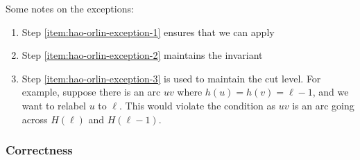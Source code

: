 Some notes on the exceptions:
\begin{enumerate}
    \item Step \ref{item:hao-orlin-exception-1} ensures that we can apply 
    \item Step \ref{item:hao-orlin-exception-2} maintains the invariant
    \item Step \ref{item:hao-orlin-exception-3} is used to maintain the cut level. For example, suppose there is an arc $uv$ where $h(u) = h(v) = \ell - 1$, and we want to relabel $u$ to $\ell$. This would violate the condition as $uv$ is an arc going across $H(\ell)$ and $H(\ell - 1)$.
\end{enumerate}
    

\subsubsection{Correctness}